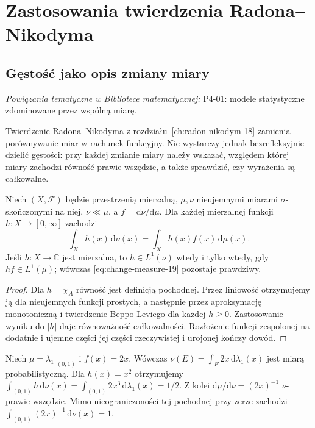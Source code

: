 \chapter{Zastosowania twierdzenia Radona--Nikodyma}
\label{ch:rn-applications-19}

\providecommand{\atlasref}[2]{#2}


\section{Gęstość jako opis zmiany miary}

\noindent\emph{Powiązania tematyczne w Bibliotece matematycznej:} \atlasref{P4-01::ch:eksperyment}{P4-01: modele statystyczne zdominowane przez wspólną miarę}.

Twierdzenie Radona--Nikodyma z rozdziału~\ref{ch:radon-nikodym-18}
zamienia porównywanie miar w rachunek funkcyjny. Nie wystarczy jednak
bezrefleksyjnie dzielić gęstości: przy każdej zmianie miary należy
wskazać, względem której miary zachodzi równość prawie wszędzie,
a także sprawdzić, czy wyrażenia są całkowalne.

\begin{twierdzenie}
\label{thm:change-measure-19}
Niech $(X,\mathcal F)$ będzie przestrzenią mierzalną,
$\mu,\nu$ nieujemnymi miarami $\sigma$-skończonymi na niej,
$\nu\ll\mu$, a $f=\mathrm d\nu/\mathrm d\mu$.
Dla każdej mierzalnej funkcji $h:X\to[0,\infty]$ zachodzi
\begin{equation}\label{eq:change-measure-19}
 \int_X h(x)\,\mathrm d\nu(x)
 =\int_X h(x)f(x)\,\mathrm d\mu(x).
\end{equation}
Jeśli $h:X\to\mathbb C$ jest mierzalna, to $h\in L^1(\nu)$
wtedy i tylko wtedy, gdy $hf\in L^1(\mu)$; wówczas
\eqref{eq:change-measure-19} pozostaje prawdziwy.
\end{twierdzenie}
\begin{proof}
Dla $h=\chi_A$ równość jest definicją pochodnej.
Przez liniowość otrzymujemy ją dla nieujemnych funkcji prostych,
a następnie przez aproksymację monotoniczną i twierdzenie Beppo
Leviego dla każdej $h\ge0$. Zastosowanie wyniku do $|h|$
daje równoważność całkowalności. Rozłożenie funkcji zespolonej
na dodatnie i ujemne części jej części rzeczywistej i urojonej
kończy dowód.
\end{proof}

\begin{przyklad}
Niech $\mu=\lambda_1|_{(0,1)}$ i $f(x)=2x$.
Wówczas $\nu(E)=\int_E 2x\,\mathrm d\lambda_1(x)$ jest
miarą probabilistyczną. Dla $h(x)=x^2$ otrzymujemy
$\int_{(0,1)}h\,\mathrm d\nu(x)
=\int_{(0,1)}2x^3\,\mathrm d\lambda_1(x)=1/2$.
Z kolei $\mathrm d\mu/\mathrm d\nu=(2x)^{-1}$
$\nu$-prawie wszędzie. Mimo nieograniczoności tej pochodnej
przy zerze zachodzi
$\int_{(0,1)}(2x)^{-1}\,\mathrm d\nu(x)=1$.
\end{przyklad}

